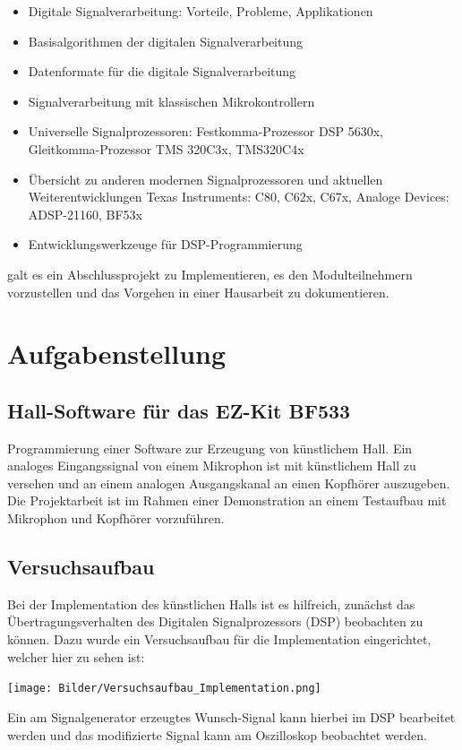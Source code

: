 \documentclass[a4paper,12pt,fontsize=12,DIV=12]{scrartcl}
\begin{document}
 \begin{itemize} 
\item Digitale Signalverarbeitung: Vorteile, Probleme, Applikationen
\item Basisalgorithmen der digitalen Signalverarbeitung
\item Datenformate für die digitale Signalverarbeitung
\item Signalverarbeitung mit klassischen Mikrokontrollern
\item Universelle Signalprozessoren: Festkomma-Prozessor DSP 5630x, Gleitkomma-Prozessor TMS 320C3x, TMS320C4x
\item Übersicht zu anderen modernen Signalprozessoren und aktuellen Weiterentwicklungen Texas Instruments: C80, C62x, C67x, Analoge Devices: ADSP-21160, BF53x
\item Entwicklungswerkzeuge für DSP-Programmierung
\end{itemize}

galt es ein Abschlussprojekt zu Implementieren, es den Modulteilnehmern vorzustellen und das Vorgehen in einer Hausarbeit zu dokumentieren.

\section{Aufgabenstellung}

\subsection{Hall-Software für das EZ-Kit BF533}
Programmierung einer Software zur Erzeugung von künstlichem Hall. Ein analoges Eingangssignal von einem Mikrophon ist mit künstlichem Hall zu versehen und an einem analogen Ausgangskanal an einen Kopfhörer auszugeben.
\newline
Die Projektarbeit ist im Rahmen einer Demonstration an einem Testaufbau mit Mikrophon und Kopfhörer vorzuführen.

\subsection{Versuchsaufbau}
Bei der Implementation des künstlichen Halls ist es hilfreich, zunächst das Übertragungsverhalten des Digitalen Signalprozessors (DSP) beobachten zu können. Dazu wurde ein Versuchsaufbau für die Implementation eingerichtet, welcher hier zu sehen ist:
\begin{center}
\texttt{[image: Bilder/Versuchsaufbau\_Implementation.png]}
\end{center}
Ein am Signalgenerator erzeugtes Wunsch-Signal kann hierbei im DSP bearbeitet werden und das modifizierte Signal kann am Oszilloskop beobachtet werden.
\end{document}
